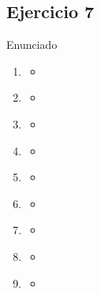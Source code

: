 \documentclass{article}
\begin{document}
      \subsection{Ejercicio 7}
        Enunciado
        \\
        \begin{enumerate}[label=(\alph*)]
          \item \textit{}
            \begin{itemize}
              \item 
            \end{itemize}
          \item \textit{}
            \begin{itemize}
              \item 
            \end{itemize}
          \item \textit{}
            \begin{itemize}
              \item 
            \end{itemize}
          \item \textit{}
            \begin{itemize}
              \item 
            \end{itemize}
          \item \textit{}
            \begin{itemize}
              \item 
            \end{itemize}
          \item \textit{}
            \begin{itemize}
              \item
            \end{itemize}
          \item \textit{}
            \begin{itemize}
              \item 
            \end{itemize}
          \item \textit{}
            \begin{itemize}
              \item 
            \end{itemize}
          \item \textit{}
            \begin{itemize}
              \item 
            \end{itemize}
        \end{enumerate}
\end{document}
